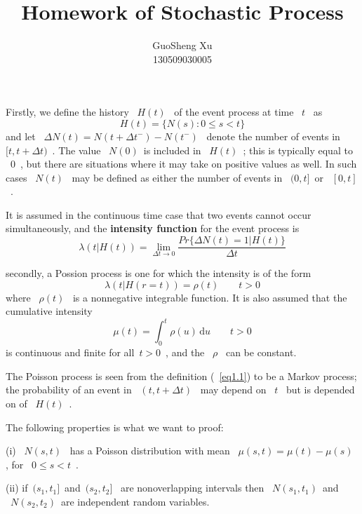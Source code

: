 \documentclass{article}
\title{Homework of Stochastic Process}
\author{GuoSheng Xu\\130509030005}
\newcommand{\ud}{\,\mathrm{d}}
\begin{document}
\maketitle
Firstly, we define the history ~$H(t)$~ of the event process at time ~$t$~ as
$$H(t) = \{N(s):0 \leq s <t\}$$
and let ~$\Delta N(t) = N(t+\Delta t^-)-N(t^-)$~ denote the number of events in ~$[t,t+\Delta t)$~. The value ~$N(0)$~is included in ~$H(t)$~; this is typically equal to ~$0$~, but there are situations where it may take on positive values as well. In such cases ~$N(t)$~ may be defined as either the number of events in ~$(0,t]$~or ~$[0,t]$~.	
		
		It is assumed in the continuous time case that two events cannot occur simultaneously, and the \textbf{intensity function} for the event process is
$$\lambda(t|H(t))=\lim_{\Delta t\rightarrow 0}\frac{Pr\{\Delta N(t) = 1|H(t)\}}{\Delta t}$$
		
secondly, a Possion process is one for which the intensity is of the form
\begin{equation}\label{eq1.1}
\lambda(t|H(r=t)) =\rho(t) \qquad t>0
\end{equation}
where ~$\rho (t)$~ is a nonnegative integrable function. It is also assumed that the cumulative intensity
$$\mu(t) = \int_0^t\rho(u) \ud u \qquad t>0$$
is continuous and finite for all~$t>0$~, and the ~$\rho$~ can be constant.
		
The Poisson process is seen from the definition (~\ref{eq1.1}) to be a Markov process; the probability of an event in ~$(t,t+\Delta t)$~ may depend on ~$t$~ but is depended on of ~$H(t)$~.
		
The following properties is what we want to proof:

(i) ~$N(s,t)$~ has a Poisson distribution with mean ~$\mu(s,t)=\mu(t)-\mu(s)$~
, for ~$0\leq s <t$~.

(ii) if~$(s_1,t_1]$~and~$(s_2,t_2]$~ are nonoverlapping intervals then ~$N(s_1,t_1)$~and~\\
		~$N(s_2,t_2)$~are independent random variables.

\end{document}
